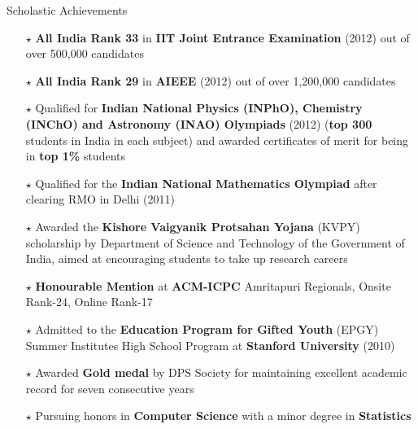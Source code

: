 \documentclass{resume2} %
\begin{document}
\vspace{1.76cm}

\begin{rSection}{Scholastic Achievements}
\begin{itemize}[leftmargin=*]
\item[$\star$] \textbf{All India Rank 33} in \textbf{IIT Joint Entrance Examination} (2012) out of over 500,000 candidates
\item[$\star$] \textbf{All India Rank 29} in \textbf{AIEEE} (2012) out of over 1,200,000 candidates
\item[$\star$] Qualified for \textbf{Indian National Physics (INPhO), Chemistry (INChO) and Astronomy (INAO) Olympiads} (2012) (\textbf{top 300} students in India in each subject) and awarded certificates of merit for being in \textbf{top 1\%} students
\item[$\star$] Qualified for the \textbf{Indian National Mathematics Olympiad} after clearing RMO in Delhi (2011)
\item[$\star$] Awarded the \textbf{Kishore Vaigyanik Protsahan Yojana} (KVPY) scholarship by Department of Science and Technology  of the Government of India, aimed at encouraging students to take up research careers
\item[$\star$] \textbf{Honourable Mention} at \textbf{ACM-ICPC} Amritapuri Regionals, Onsite Rank-24, Online Rank-17
\item[$\star$] Admitted to the \textbf{Education Program for Gifted Youth} (EPGY) Summer
Institutes High School Program at \textbf{Stanford University} (2010)
\item[$\star$] Awarded \textbf{Gold medal} by DPS Society for maintaining excellent academic record for seven consecutive years
\item[$\star$] Pursuing honors in \textbf{Computer Science} with a minor degree in \textbf{Statistics}
\end{itemize}
\end{rSection}

\end{document}
